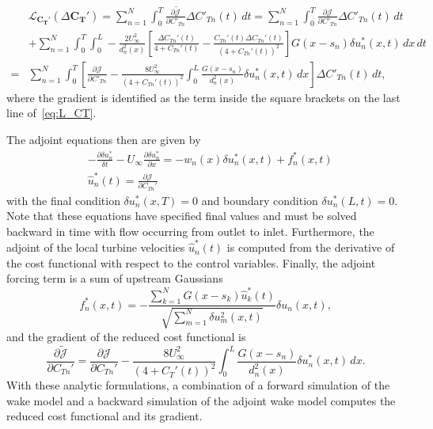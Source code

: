 \begin{align}
\label{eq:L_CT}
&\mathcal{L}_\mathbf{C_T'}(\Delta \mathbf{C_T'}) = \sum_{n=1}^N \int_0^T \frac{\partial \tilde{\mathcal{J}}}{\partial C'_{Tn}} \Delta C'_{Tn}(t) \, dt =  \sum_{n=1}^N \int_0^T \frac{\partial \mathcal{J}}{\partial C'_{Tn}} \Delta C'_{Tn}(t) \, dt \nonumber\\
&+ \sum_{n=1}^N \int_0^T \int_0^L - \frac{2 U_\infty^2}{ d_n^2(x)} \left[\frac{\Delta C_{Tn}'(t)}{4 + C_{Tn}'(t)} - \frac{C_{Tn}'(t)\Delta C_{Tn}'(t)}{(4 + C_{Tn}'(t))^2} \right]G(x-s_n) \delta u_n^*(x,t) \, dx \, dt \nonumber \\
=& \sum_{n=1}^N \int_0^T \left[ \frac{\partial \mathcal{J}}{\partial C'_{Tn}} - \frac{8 U_\infty^2 }{(4 + C_{Tn}'(t))^2} \int_0^L\frac{G(x-s_n)}{ d_n^2(x)} \delta u_n^*(x,t) \, dx \right]\Delta C'_{Tn}(t) \, dt,
\end{align}
where the gradient is identified as the term inside the square brackets on the last line of~\eqref{eq:L_CT}.

The adjoint equations then are given by
\begin{align}
\label{eq:adjoint1}
& - \frac{\partial \delta u_n^*}{\delta t} - U_\infty \frac{\partial \delta u_n^*}{\partial x} = -w_n(x) \delta u_n^*(x,t) + f_n^*(x,t) \\
\label{eq:adjoint2}
& \hat{u}_n^*(t) = \frac{\partial \mathcal{J}}{\partial C_{Tn}'}
\end{align}
with the final condition $\delta u_n^*(x,T) = 0$ and boundary condition $\delta u_n^*(L,t) = 0$. Note that these equations have specified final values and must be solved backward in time with flow occurring from outlet to inlet. Furthermore, the adjoint of the local turbine velocities $\hat{u}_n^*(t)$ is computed from the derivative of the cost functional with respect to the control variables. Finally, the adjoint forcing term is a sum of upstream Gaussians
\begin{equation}
f^*_n(x,t) = - \frac{\sum_{k=1}^N G(x-s_k)\hat{u}_k^*(t)}{\sqrt{\sum_{m=1}^N \delta u_m^2(x,t)}}\delta u_n(x,t),
\end{equation} 
and the gradient of the reduced cost functional is
\begin{equation}
\frac{\partial \tilde{\mathcal{J}}}{\partial C_{Tn}'} = \frac{\partial \mathcal{J}}{\partial C_{Tn}'}  - \frac{8 U_\infty^2}{(4 + C_T'(t))^2} \int_0^L \frac{G(x-s_n)}{d_n^2(x)} \delta u_n^*(x,t) \, dx.
\end{equation}
With these analytic formulations, a combination of a forward simulation of the wake model and a backward simulation of the adjoint wake model computes the reduced cost functional and its gradient.

